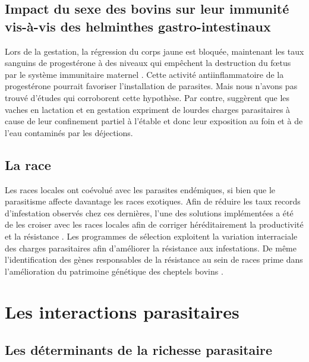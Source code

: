 \subsection{Impact du sexe des bovins sur leur immunité vis-à-vis des helminthes 
gastro-intestinaux}
Lors de la gestation, la régression du corps jaune est bloquée, maintenant les taux 
sanguins de progestérone à des niveaux qui empêchent la destruction du fœtus par le 
système immunitaire maternel . Cette activité antiinflammatoire de 
la progestérone pourrait favoriser l'installation de parasites. Mais nous n'avons 
pas trouvé d'études qui corroborent cette hypothèse. Par contre,  
suggèrent que les vaches en lactation et en gestation expriment de lourdes charges 
parasitaires à cause de leur confinement partiel à l'étable et donc leur exposition 
au foin et à de l'eau contaminés par les déjections.

\subsection{La race}
Les races locales ont coévolué avec les parasites endémiques, si bien que le parasitisme 
affecte davantage les races exotiques. Afin de réduire les taux records d'infestation 
observés chez ces dernières, l'une des solutions implémentées a été de les croiser 
avec les races locales afin de corriger héréditairement la productivité et la résistance 
. Les programmes de sélection exploitent la variation interraciale 
des charges parasitaires afin d'améliorer la résistance aux infestations. De même 
l'identification des gènes responsables de la résistance au sein de races prime dans 
l'amélioration du patrimoine génétique des cheptels bovins .

\section{Les interactions parasitaires}
\subsection{Les déterminants de la richesse parasitaire}
